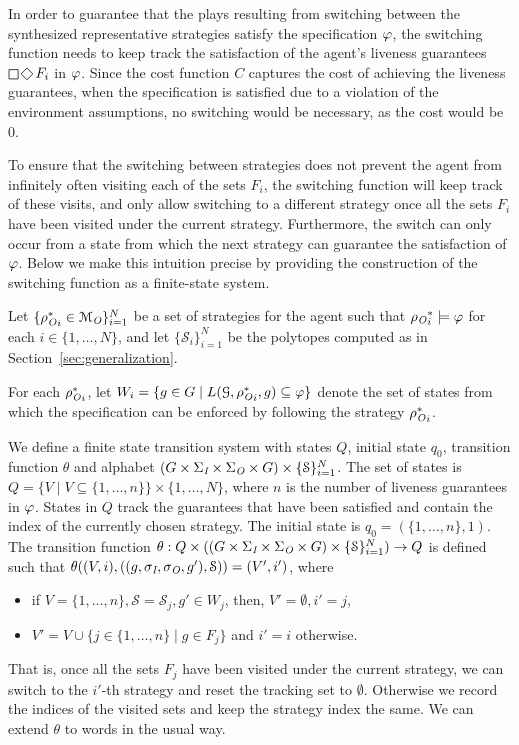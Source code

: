 In order to guarantee that the plays resulting from switching between the synthesized representative strategies satisfy the specification $\varphi$, the switching function needs to keep track the satisfaction of the agent's liveness guarantees $\LTLglobally\LTLfinally F_i$ in $\varphi$. Since the cost function $C$ captures the cost of achieving the liveness guarantees, when the specification is satisfied due to a violation of the environment assumptions, no switching would be necessary, as the cost would be $0$.

To ensure that the switching between strategies does not prevent the agent from infinitely often visiting each of the sets $F_i$, the switching function will keep track of these visits, and only allow switching to a different strategy once all the sets $F_i$ have been visited under the current strategy. Furthermore, the switch can only occur from a state from which the next strategy can guarantee the satisfaction of $\varphi$. Below we make this intuition precise by providing the construction of the switching function as a finite-state system.

Let $\{{\rho_{\textit{O}}^\ast}_i\in \mathcal{M}_{\textit{O}}\}_{i=1}^{N}$ be a set of strategies  for the agent such that ${\rho_{\textit{O}}}_i^\ast \models \varphi$ for each $i \in \{1,\ldots,N\}$, and let $\{\mathcal S_i\}_{i=1}^N$ be the polytopes computed as in Section~\ref{sec:generalization}.

For each ${\rho_{\textit{O}}^\ast}_i$, let $W_i = \{g\in G \mid L(\mathcal{G},{\rho_{\textit{O}}^\ast}_i,g)\subseteq \varphi\}$ denote the set of states from which the specification can be enforced by following the strategy ${\rho_{\textit{O}}^\ast}_i$.

We define a finite state transition system with states $Q$, initial state $q_0$, transition function $\theta$ and alphabet $(G \times \Sigma_{\textit{I}} \times \Sigma_{\textit{O}} \times G) \times \{\mathcal S\}_{i=1}^N$. The set of states is $Q = \{ V \mid V \subseteq \{1,\ldots, n\}\} \times \{1,\ldots,N\}$, where $n$ is the number of liveness guarantees in $\varphi$. States in $Q$ track the guarantees that have been satisfied and contain the index of the currently chosen strategy. The initial state is $q_0 = (\{1,\ldots,n\},1)$. The transition function $\theta : Q \times ((G \times \Sigma_{\textit{I}} \times \Sigma_{\textit{O}} \times G) \times \{\mathcal S\}_{i=1}^N) \to Q$ is defined such that 
$\theta((V,i),((g,\sigma_{\textit{I}}, \sigma_{\textit{O}}, g'),\mathcal S)) = (V',i')$, where
\begin{itemize}
\item if $V = \{1,\ldots,n\}, \mathcal S = \mathcal S_{j}, g' \in W_{j}$, then, $V' = \emptyset, i'=j$,
\item $V' = V \cup \{j \in \{1,\ldots,n\} \mid g \in F_j\}$ and $i'=i$ otherwise.
\end{itemize}
That is, once all the sets $F_j$ have been visited under the current strategy, we can switch to the $i'$-th strategy and reset the tracking set to $\emptyset$. Otherwise we record the indices of the visited sets and keep the strategy index the same. We can extend $\theta$ to words in the usual way. 

